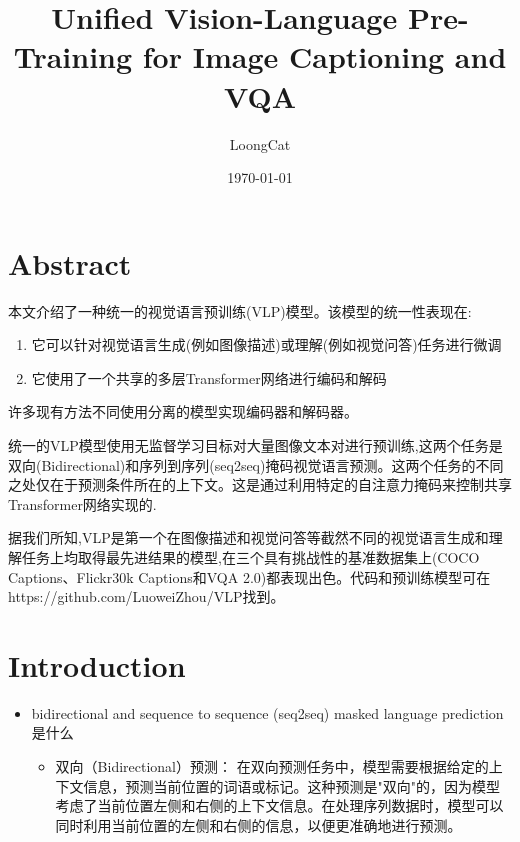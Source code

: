 \documentclass[a4paper]{article}
\title{Unified Vision-Language Pre-Training for Image Captioning and VQA}
\author{LoongCat}
\date{\today}
\begin{document}
\begin{sloppypar}
      \maketitle
      \newpage
      \begin{spacing}{1}
            {\small \tableofcontents}
      \end{spacing}


      \newpage



      \section{Abstract}

      本文介绍了一种统一的视觉语言预训练(VLP)模型。该模型的统一性表现在:

      \begin{enumerate}
            \item 它可以针对视觉语言生成(例如图像描述)或理解(例如视觉问答)任务进行微调
            \item 它使用了一个共享的多层Transformer网络进行编码和解码
      \end{enumerate}

      许多现有方法不同使用分离的模型实现编码器和解码器。

      统一的VLP模型使用无监督学习目标对大量图像文本对进行预训练,这两个任务是双向(Bidirectional)和序列到序列(seq2seq)掩码视觉语言预测。这两个任务的不同之处仅在于预测条件所在的上下文。这是通过利用特定的自注意力掩码来控制共享Transformer网络实现的.

      据我们所知,VLP是第一个在图像描述和视觉问答等截然不同的视觉语言生成和理解任务上均取得最先进结果的模型,在三个具有挑战性的基准数据集上(COCO Captions、Flickr30k Captions和VQA 2.0)都表现出色。代码和预训练模型可在https://github.com/LuoweiZhou/VLP找到。
      \section{Introduction}

      \begin{itemize}
            \item bidirectional and sequence to sequence (seq2seq) masked language prediction是什么
                  \begin{itemize}
                        \item 双向（Bidirectional）预测：
                              在双向预测任务中，模型需要根据给定的上下文信息，预测当前位置的词语或标记。这种预测是"双向"的，因为模型考虑了当前位置左侧和右侧的上下文信息。在处理序列数据时，模型可以同时利用当前位置的左侧和右侧的信息，以便更准确地进行预测。


\end{itemize}
\end{itemize}
\end{sloppypar}
\end{document}
